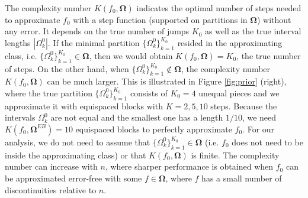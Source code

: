 \documentclass{article}
\newcommand{\1}{\mathbb{I}}
\newcommand{\bm}[1]{\boldsymbol{#1}}
\theoremstyle{assumption}
\newtheorem{assumption}{Assumption}
\begin{document}
The complexity number $K(f_0,\bm{\Omega})$  indicates the optimal number of steps needed to approximate $f_0$  with a step function (supported  on partitions in $\bm{\Omega}$) without any error.  It depends on the true number of jumps  $K_0$ as well as the true interval lengths $|\Omega_k^0|$. {If  the minimal partition $\{\Omega_k^0\}_{k=1}^{K_0}$ resided in the approximating class, i.e. $\{\Omega_k^0\}_{k=1}^{K_0}\in\bm{\Omega}$, then we would obtain $K(f_0,\bm{\Omega})=K_0$,  the true number of steps.}
On the other hand, when  $\{\Omega_k^0\}_{k=1}^{K_0}\notin \bm{\Omega}$, the complexity number $K(f_0,\bm{\Omega})$ can be much larger. This is illustrated in Figure \ref{fig:prior} (right), where the true partition $\{\Omega_k^0\}_{k=1}^{K_0}$ consists of $K_0=4$ unequal pieces and we approximate it with equispaced blocks with $K=2,5,10$ steps. Because the intervals $\Omega_k^0$ are not equal and the smallest one has a length $1/10$, we need $K(f_0,\bm{\Omega}^{EB})=10$  equispaced blocks to perfectly approximate  $f_0$.  For our analysis, we  do not need to assume that $\{\Omega_k^0\}_{k=1}^{K_0}\in\bm{\Omega}$ (i.e. $f_0$ does not need to be inside the approximating class) or  that $K(f_0,\bm{\Omega})$ is finite. The complexity number can increase with $n$, where sharper performance is obtained when $f_0$ can be approximated error-free with  some $f\in\bm{\Omega}$, where $f$  has a small number of discontinuities relative to $n$. 


 \iffalse
\begin{figure}[t]
  \centering
  \texttt{[image: K0.pdf]}
  \caption{Best approximations of $f_0$ (in the $\ell_2$ sense) by step functions supported on equal blocks  of size $K \in \{2, 5, 10\}$.}
  \label{fig:K0}
\end{figure}
\fi

\iffalse
\begin{assumption}\label{ass:existence}
Let $\bm{\Omega}$ be a class of approximating partitions. We assume that $f_0$ is $\bm{\Omega}$-valid, i.e.  $K(f_0,\bm{\Omega}) < \sqrt{n}$.
\end{assumption}
\fi
\end{document}
